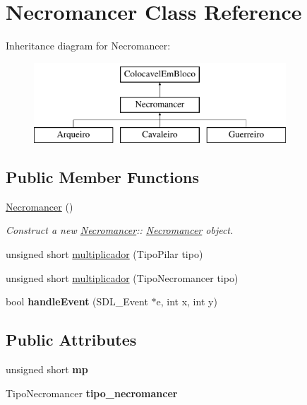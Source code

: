 \hypertarget{class_necromancer}{}\section{Necromancer Class Reference}
\label{class_necromancer}
Inheritance diagram for Necromancer\+:\begin{figure}[H]
\begin{center}
\leavevmode
\includegraphics[height=3.000000cm]{class_necromancer}
\end{center}
\end{figure}
\subsection*{Public Member Functions}
\begin{DoxyCompactItemize}
\item 
\mbox{\label{class_necromancer_a2d9f222048d7321295264900dd5879f9}} 
\mbox{\hyperlink{class_necromancer_a2d9f222048d7321295264900dd5879f9}{Necromancer}} ()
\begin{DoxyCompactList}\small\item\em Construct a new \mbox{\hyperlink{class_necromancer}{Necromancer}}\+:\+: \mbox{\hyperlink{class_necromancer}{Necromancer}} object. \end{DoxyCompactList}\item 
unsigned short \mbox{\hyperlink{class_necromancer_ae276261d4338078bb09b24e73c1abb5b}{multiplicador}} (Tipo\+Pilar tipo)
\item 
unsigned short \mbox{\hyperlink{class_necromancer_ad8a25efaa26240e028c893d1df80b067}{multiplicador}} (Tipo\+Necromancer tipo)
\item 
\mbox{\label{class_necromancer_a8e7451787b08609862b19851bfb5e699}} 
bool {\bfseries handle\+Event} (S\+D\+L\+\_\+\+Event $\ast$e, int x, int y)
\end{DoxyCompactItemize}
\subsection*{Public Attributes}
\begin{DoxyCompactItemize}
\item 
\mbox{\label{class_necromancer_a59c7606cb39566c863099344f8ab06ed}} 
unsigned short {\bfseries mp}
\item 
\mbox{\label{class_necromancer_ad2db9dae93163aa8506be6ded7861906}} 
Tipo\+Necromancer {\bfseries tipo\+\_\+necromancer}
\end{DoxyCompactItemize}


